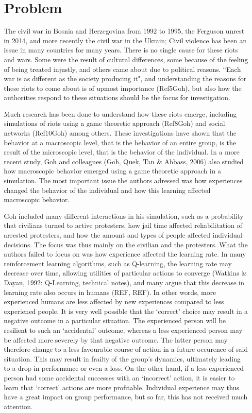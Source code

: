 \chapter{Problem}
The civil war in Bosnia and Herzegovina from 1992 to 1995, the Ferguson unrest in 2014, and more recently the civil war in the Ukrain; Civil violence has been an issue in many countries for many years. There is no single cause for these riots and wars. Some were the result of cultural differences, some because of the feeling of being treated injustly, and others came about due to political reasons. ``Each war is as different as the society producing it", and understanding the reasons for these riots to come about is of upmost importance (Ref5Goh), but also how the authorities respond to these situations should be the focus for investigation. 

Much research has been done to understand how these riots emerge, including simulations of riots using a game theoretic approach (Ref8Goh) and social networks (Ref10Goh) among others. These investigations have shown that the behavior at a macroscopic level, that is the behavior of an entire group, is the result of the microscopic level, that is the behavior of the individual. In a more recent study, Goh and colleagues (Goh, Quek, Tan \& Abbass, 2006) also studied how macroscopic behavior emerged using a game theoretic approach in a simulation. The most important issue the authors adressed was how experiences changed the behavior of the individual and how this learning affected macroscopic behavior. 

Goh included many different interactions in his simulation, such as a probability that civilians turned to active protesters, how jail time affected rehabilitation of arrested protesters, and how the amount and types of people affected individual decisions. The focus was thus mainly on the civilian and the protesters. What the authors failed to focus on was how experience affected the learning rate. In many re\"inforcement learning algorithms, such as Q-learning, the learning rate may decrease over time, allowing utilities of particular actions to converge (Watkins \& Dayan, 1992: Q-Learning, technical notes), and many argue that this decrease in learning rate also occurs in humans (REF, REF). In other words, more experienced humans are less affected by new experiences compared to less experiened people. It is very well possible that the `correct' choice may result in a negative outcome in a particular situation. The experienced person will be resilient to such an `accidental' outcome, whereas a less experienced person may be affected more severely by that negative outcome. The latter person may therefore change to a less favourable course of action in a future occurence of said situation. This may result in frailty of the group's dynamics, ultimately leading to a drop in performance or even a loss. On the other hand, if a less experienced person had some accidental successes with an `incorrect' action, it is easier to learn that `correct' actions are more profitable. Individual experience may thus have a great impact on group performance, but so far, this has not received much attention. 


